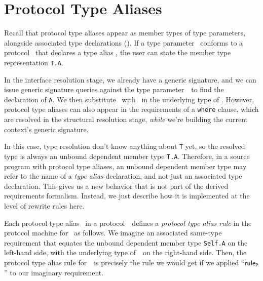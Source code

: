 \documentclass[../generics]{subfiles}
\begin{document}
\section{Protocol Type Aliases}\label{protocol type aliases}

Recall that protocol type aliases appear as member types of type parameters, alongside associated type declarations (). If a type parameter \tT\ conforms to a protocol \tP\ that declares a type alias \nA, the user can state the member type representation \texttt{T.A}.

In the interface resolution stage, we already have a generic signature, and we can issue generic signature queries against the type parameter~\tT\ to find the declaration of \texttt{A}. We then substitute \tSelf\ with \tT\ in the underlying type of \nA. However, protocol type aliases can also appear in the requirements of a \texttt{where} clause, which are resolved in the structural resolution stage, \emph{while} we're building the current context's generic signature.

In this case, type resolution don't know anything about \texttt{T} yet, so the resolved type is always an unbound dependent member type \texttt{T.A}. Therefore, in a source program with protocol type aliases, an unbound dependent member type may refer to the name of a \emph{type alias} declaration, and not just an associated type declaration. This gives us a new behavior that is not part of the derived requirements formalism. Instead, we just describe how it is implemented at the level of rewrite rules here.

Each protocol type alias \nA\ in a protocol~\tP\ defines a \emph{protocol type alias rule} in the protocol machine for \tP\ as follows. We imagine an associated same-type requirement that equates the unbound dependent member type \texttt{Self.A} on the left-hand side, with the underlying type of~\nA\  on the right-hand side. Then, the protocol type alias rule for~\nA\ is precisely the rule we would get if we applied ``$\mathsf{rule}_{\texttt{P}}$'' to our imaginary requirement.
\end{document}
